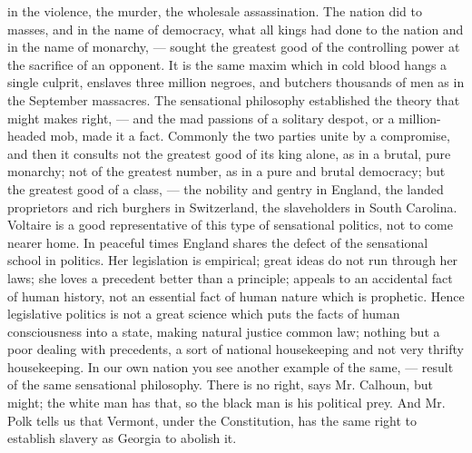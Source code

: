 \documentclass[12pt]{article}
\begin{document}
in the violence, the murder, the wholesale assassination. 
The nation did to masses, and in the name of democracy, what all kings had done to the nation and in the 
name of monarchy, --- sought the greatest good of the 
controlling power at the sacrifice of an opponent. It 
is the same maxim which in cold blood hangs a single 
culprit, enslaves three million negroes, and butchers 
thousands of men as in the September massacres. The 
sensational philosophy established the theory that 
might makes right, --- and the mad passions of a solitary despot, or a million-headed mob, made it a fact. 
Commonly the two parties unite by a compromise, and 
then it consults not the greatest good of its king alone, 
as in a brutal, pure monarchy; not of the greatest 
number, as in a pure and brutal democracy; but the 
greatest good of a class, --- the nobility and gentry in 
England, the landed proprietors and rich burghers in 
Switzerland, the slaveholders in South Carolina. Voltaire is a good representative of this type of sensational politics, not to come nearer home. In peaceful 
times England shares the defect of the sensational 
school in politics. Her legislation is empirical; great 
ideas do not run through her laws; she loves a precedent 
better than a principle; appeals to an accidental fact 
of human history, not an essential fact of human nature which is prophetic. Hence legislative politics is 
not a great science which puts the facts of human consciousness into a state, making natural justice common 
law; nothing but a poor dealing with precedents, a 
sort of national housekeeping and not very thrifty 
housekeeping. In our own nation you see another 
example of the same, --- result of the same sensational 
philosophy. There is no right, says Mr. Calhoun,
but might; the white man has that, so the black man 
is his political prey. And Mr. Polk tells us that Vermont, under the Constitution, has the same right to 
establish slavery as Georgia to abolish it. 
\end{document}
